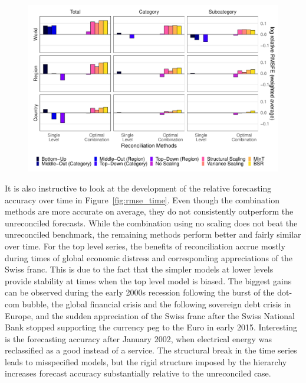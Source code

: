 \documentclass[a4paper,fleqn,11pt]{article}
\begin{document}
\begin{figure}[H]
	\includegraphics[width=\textwidth]{fig/fig_eval_rmse_relative}
	\label{fig:rmse}
\end{figure}

It is also instructive to look at the development of the relative forecasting accuracy over time in Figure~\ref{fig:rmse_time}. Even though the combination methods are more accurate on average, they do not consistently outperform the unreconciled forecasts. While the combination using no scaling does not beat the unreconciled benchmark, the remaining methods perform better and fairly similar over time. For the top level series, the benefits of reconciliation accrue mostly during times of global economic distress and corresponding appreciations of the Swiss franc. This is due to the fact that the simpler models at lower levels provide stability at times when the top level model is biased. The biggest gains can be observed during the early 2000s recession following the burst of the dot-com bubble, the global financial crisis and the following sovereign debt crisis in Europe, and the sudden appreciation of the Swiss franc after the Swiss National Bank stopped supporting the currency peg to the Euro in early 2015. Interesting is the forecasting accuracy after January 2002, when electrical energy was reclassified as a good instead of a service. The structural break in the time series leads to misspecified models, but the rigid structure imposed by the hierarchy increases forecast accuracy substantially relative to the unreconciled case.
\end{document}
